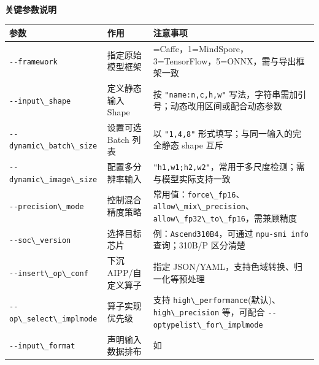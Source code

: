 \textbf{关键参数说明}

\begin{longtable}[]{@{}
  >{\raggedright\arraybackslash}p{}
  >{\raggedright\arraybackslash}p{}
  >{\raggedright\arraybackslash}p{}@{}}
\toprule\noalign{}
\begin{minipage}[b]{\linewidth}\raggedright
参数
\end{minipage} & \begin{minipage}[b]{\linewidth}\raggedright
作用
\end{minipage} & \begin{minipage}[b]{\linewidth}\raggedright
注意事项
\end{minipage} \\
\midrule\noalign{}
\endhead
\bottomrule\noalign{}
\endlastfoot
\passthrough{\lstinline!--framework!} & 指定原始模型框架 &
0=Caffe，1=MindSpore，3=TensorFlow，5=ONNX，需与导出框架一致 \\
\passthrough{\lstinline!--input\_shape!} & 定义静态输入 Shape & 按
\passthrough{\lstinline!"name:n,c,h,w"!}
写法，字符串需加引号；动态改用区间或配合动态参数 \\
\passthrough{\lstinline!--dynamic\_batch\_size!} & 设置可选 Batch 列表 &
以 \passthrough{\lstinline!"1,4,8"!} 形式填写；与同一输入的完全静态
shape 互斥 \\
\passthrough{\lstinline!--dynamic\_image\_size!} & 配置多分辨率输入 &
\passthrough{\lstinline!"h1,w1;h2,w2"!}，常用于多尺度检测；需与模型实际支持一致 \\
\passthrough{\lstinline!--precision\_mode!} & 控制混合精度策略 &
常用值：\passthrough{\lstinline!force\_fp16!}、\passthrough{\lstinline!allow\_mix\_precision!}、\passthrough{\lstinline!allow\_fp32\_to\_fp16!}，需兼顾精度 \\
\passthrough{\lstinline!--soc\_version!} & 选择目标芯片 &
例：\passthrough{\lstinline!Ascend310B4!}，可通过
\passthrough{\lstinline!npu-smi info!} 查询；310B/P 区分清楚 \\
\passthrough{\lstinline!--insert\_op\_conf!} & 下沉 AIPP/自定义算子 &
指定 JSON/YAML，支持色域转换、归一化等预处理 \\
\passthrough{\lstinline!--op\_select\_implmode!} & 算子实现优先级 & 支持
\passthrough{\lstinline!high\_performance!}(默认)、\passthrough{\lstinline!high\_precision!}
等，可配合 \passthrough{\lstinline!--optypelist\_for\_implmode!} \\
\passthrough{\lstinline!--input\_format!} & 声明输入数据排布 & 如

\end{longtable}
